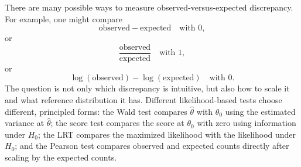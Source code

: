 \documentclass[12pt]{article}
\begin{document}
There are many possible ways to measure observed-versus-expected discrepancy. For example, one might compare
\[
\text{observed}-\text{expected} \quad \text{with }0,
\]
or
\[
\frac{\text{observed}}{\text{expected}} \quad \text{with }1,
\]
or
\[
\log(\text{observed})-\log(\text{expected}) \quad \text{with }0.
\]
The question is not only which discrepancy is intuitive, but also how to scale it and what reference distribution it has. Different likelihood-based tests choose different, principled forms: the Wald test compares $\hat\theta$ with $\theta_0$ using the estimated variance at $\hat\theta$; the score test compares the score at $\theta_0$ with zero using information under $H_0$; the LRT compares the maximized likelihood with the likelihood under $H_0$; and the Pearson test compares observed and expected counts directly after scaling by the expected counts.
\end{document}
